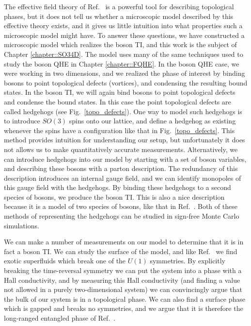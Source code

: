 The effective field theory of Ref.~\cite{SenthilVishwanath} is a powerful tool for describing topological phases, but it does not tell us whether a microscopic model described by this effective theory exists, and it gives us little intuition into what properties such a microscopic model might have. To answer these questions, we have constructed a microscopic model which realizes the boson TI, and this work is the subject of Chapter \ref{chapter::SO34D}.
The model uses many of the same techniques used to study the boson QHE in Chapter \ref{chapter::FQHE}. In the boson QHE case, we were working in two dimensions, and we realized the phase of interest by binding bosons to point topological defects (vortices), and condensing the resulting bound states. In the boson TI, we will again bind bosons to point topological defects and condense the bound states. In this case the point topological defects are called hedgehogs (see Fig.~\ref{topo_defects}). One way to model such hedgehogs is to introduce $SO(3)$ spins onto our lattice, and define a hedgehog as existing whenever the spins have a configuration like that in Fig.~\ref{topo_defects}. This method provides intuition for understanding our setup, but unfortunately it does not allows us to make quantitatively accurate measurements. Alternatively, we can introduce hedgehogs into our model by starting with a set of boson variables, and describing these bosons with a parton description. The redundancy of this description introduces an internal gauge field, and we can identify monopoles of this gauge field with the hedgehogs. By binding these hedgehogs to a second species of bosons, we produce the boson TI. This is also a nice description because it is a model of two species of bosons, like that in Ref.~\cite{SenthilVishwanath}. Both of these methods of representing the hedgehogs can be studied in sign-free Monte Carlo simulations.

We can make a number of measurements on our model to determine that it is in fact a boson TI. We can study the surface of the model, and like Ref.~\cite{SenthilVishwanath} we find exotic superfluids which break one of the $U(1)$ symmetries. By explicitly breaking the time-reversal symmetry we can put the system into a phase with a Hall conductivity, and by measuring this Hall conductivity (and finding a value not allowed in a purely two-dimensional system) we can convincingly argue that the bulk of our system is in a topological phase. We can also find a surface phase which is gapped and breaks no symmetries, and we argue that it is therefore the long-ranged entangled phase of Ref.~\cite{SenthilVishwanath}.

